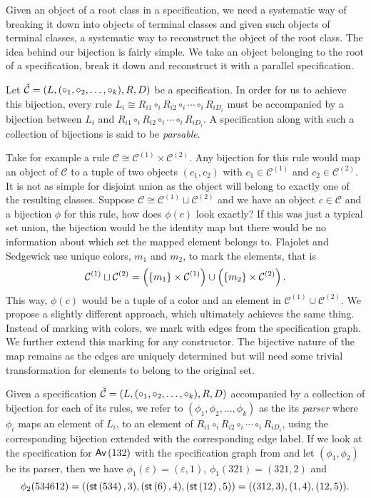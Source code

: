 \label{ch:pbijection}

Given an object of a root class in a specification, we need a systematic way of breaking it down into objects of terminal classes and given such objects of terminal classes, a systematic way to reconstruct the object of the root class. The idea behind our bijection is fairly simple. We take an object belonging to the root of a specification, break it down and reconstruct it with a parallel specification.

Let $\check{\mathcal{C}} = (L,(\circ_1,\circ_2,\dotsc,\circ_k),R,D)$ be a specification. In order for us to achieve this bijection, every rule $L_i \cong R_{i1} \circ_i R_{i2} \circ_i \dotsm \circ_i R_{iD_i}$ must be accompanied by a bijection between $L_i$ and $R_{i1} \circ_i R_{i2} \circ_i \dotsm \circ_i R_{iD_i}$. A specification along with such a collection of bijections is said to be \emph{parsable}.

Take for example a rule $\mathcal{C} \cong \mathcal{C}^{(1)} \times \mathcal{C}^{(2)}$. Any bijection for this rule would map an object of $\mathcal{C}$ to a tuple of two objects $(c_1,c_2)$ with $c_1 \in \mathcal{C}^{(1)}$ and $c_2 \in \mathcal{C}^{(2)}$. It is not as simple for disjoint union as the object will belong to exactly one of the resulting classes. Suppose $\mathcal{C} \cong \mathcal{C}^{(1)} \sqcup \mathcal{C}^{(2)}$ and we have an object $c\in\mathcal{C}$ and a bijection $\phi$ for this rule, how does $\phi(c)$ look exactly? If this was just a typical set union, the bijection would be the identity map but there would be no information about which set the mapped element belongs to. Flajolet and Sedgewick \cite{flajolet:ac} use unique colors, $m_1$ and $m_2$, to mark the elements, that is
\[
    \mathcal{C}^{(1)} \sqcup \mathcal{C}^{(2)} = \left(\left\{m_1\right\} \times \mathcal{C}^{(1)}\right) \cup \left(\left\{m_2\right\} \times \mathcal{C}^{(2)}\right).
\]
This way, $\phi(c)$ would be a tuple of a color and an element in $\mathcal{C}^{(1)} \cup \mathcal{C}^{(2)}$. We propose a slightly different approach, which ultimately achieves the same thing. Instead of marking with colors, we mark with edges from the specification graph. We further extend this marking for any constructor. The bijective nature of the map remains as the edges are uniquely determined but will need some trivial transformation for elements to belong to the original set.

Given a specification $\check{\mathcal{C}} = (L,(\circ_1,\circ_2,\dotsc,\circ_k),R,D)$ accompanied by a collection of bijection for each of its rules, we refer to $(\phi_1,\phi_2,\dotsc,\phi_k)$ as the its \emph{parser} where $\phi_i$ maps an element of $L_i$, to an element of $R_{i1} \circ_i R_{i2} \circ_i \dotsm \circ_i R_{iD_i}$, using the corresponding bijection extended with the corresponding edge label. If we look at the specification for $\textsf{Av}\left(132\right)$ with the specification graph from  and let $(\phi_1,\phi_2)$ be its parser, then we have $\phi_1(\varepsilon) = (\varepsilon, 1)$, $\phi_1(321) = (321, 2)$ and 
\[
    \phi_2(534612) = ((\textsf{st}\left(534\right),3), (\textsf{st}\left(6\right),4), (\textsf{st}\left(12\right),5)) = ((312,3), (1,4), (12,5)).
\]

